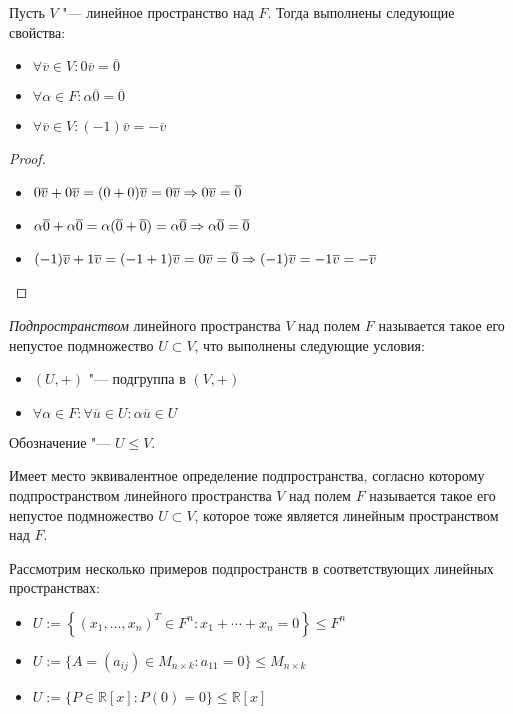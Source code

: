 \begin{proposition}
	Пусть $V$ "--- линейное пространство над $F$. Тогда выполнены следующие свойства:
	\begin{itemize}
		\item $\forall \overline{v} \in V: 0\overline{v} = \overline{0}$
		\item $\forall \alpha \in F: \alpha\overline{0} = \overline{0}$
		\item $\forall \overline{v} \in V: (-1)\overline{v} = -\overline{v}$
	\end{itemize}
\end{proposition}

\begin{proof}~
	\begin{itemize}
		\item $0\overline{v} + 0\overline{v} = (0 + 0)\overline{v} = 0\overline{v} \Rightarrow 0\overline{v} = \overline{0}$
		\item $\alpha\overline{0} + \alpha\overline{0} = \alpha(\overline{0} + \overline{0}) = \alpha\overline{0} \Rightarrow \alpha\overline{0} = \overline{0}$
		\item $(-1)\overline{v} + 1\overline{v} = (-1 + 1)\overline{v} = 0\overline{v} = \overline{0} \Rightarrow (-1)\overline{v} = -1\overline{v} = -\overline{v}$\qedhere
	\end{itemize}
\end{proof}

\begin{definition}
	\textit{Подпространством} линейного пространства $V$ над полем $F$ называется такое его непустое подмножество $U \subset V$, что выполнены следующие условия:
	\begin{itemize}
		\item $(U, +)$ "--- подгруппа в $(V, +)$
		\item $\forall \alpha \in F: \forall \overline{u} \in U: \alpha\overline{u} \in U$
	\end{itemize}
	
	Обозначение "--- $U \le V$.
\end{definition}

\begin{note}
	Имеет место эквивалентное определение подпространства, согласно которому подпространством линейного пространства $V$ над полем $F$ называется такое его непустое подмножество $U \subset V$, которое тоже является линейным пространством над $F$.
\end{note}

\begin{example}
	Рассмотрим несколько примеров подпространств в соответствующих линейных пространствах:
	\begin{itemize}
		\item $U := \left\{(x_1, \dotsc, x_n)^T \in F^n: x_1+\dotsb+x_n = 0\right\} \le F^n$
		\item $U := \{A = (a_{ij}) \in M_{n \times k}: a_{11} = 0\} \le M_{n \times k}$
		\item $U := \{P \in \mathbb{R}[x]: P(0) = 0\} \le \mathbb{R}[x]$
	\end{itemize}
\end{example}

